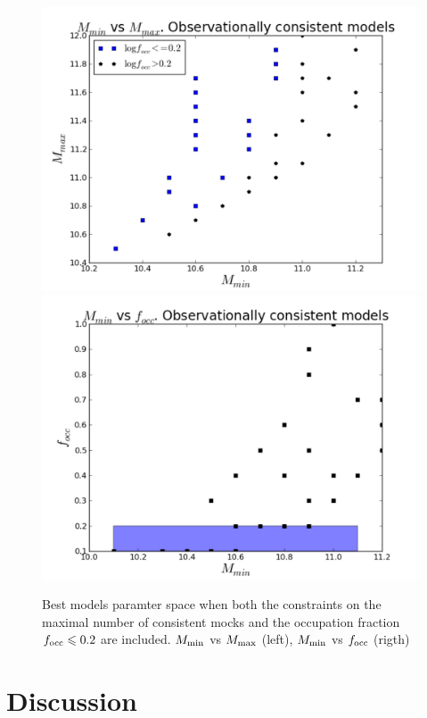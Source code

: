 \documentclass[usenatbib]{mn2e}
\begin{document}
\begin{figure}
\begin{center}
\includegraphics[width=0.46\linewidth,angle=0]{./plots/mmin_vs_mmax.pdf}
\hspace{5mm}
\includegraphics[width=0.46\linewidth,angle=0]{./plots/mmin_vs_focc.pdf}
\end{center}
\caption{Best models paramter space when both the constraints on the maximal number
  of  consistent mocks and the occupation  fraction $f_{\rm occ}\leq
  0.2$ are included. $M_{\rm min}$ vs $M_{\rm max}$ (left), $M_{\rm min}$ vs $f_{\rm occ}$ (rigth)
  \label{fig:restriction_mock_and_f_occ_corr}} 
\end{figure} 

\section{Discussion}
\end{document}
